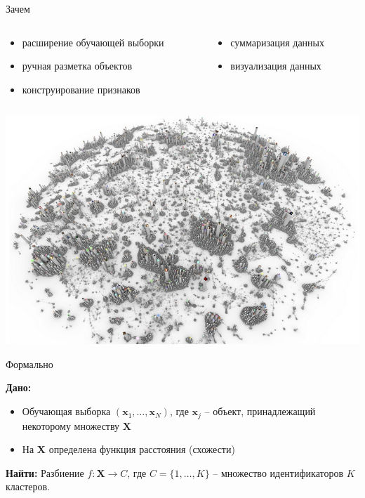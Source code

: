 \documentclass[10pt,a4paper]{beamer}
\begin{document}
\begin{frame}{Зачем}

\begin{columns}[T]
    \begin{column}{.55\textwidth}
    \begin{itemize}
	\item расширение обучающей выборки
	\item ручная разметка объектов
	\item конструирование признаков 
	\end{itemize}
    \end{column}
       
    \begin{column}{.45\textwidth}
    \begin{itemize}
	\item суммаризация данных
	\item визуализация данных
	\end{itemize}
	\end{column}
  \end{columns}

    \begin{center}
    \includegraphics[scale=0.26]{images/sover.png}
    \end{center}

\end{frame}


\begin{frame}{Формально}

{\bf Дано:}
\begin{itemize}
\item Обучающая выборка $(\mathbf x_1, \ldots, \mathbf x_N)$, где $\mathbf{x}_j$ -- объект, принадлежащий некоторому множеству $\mathbf{X}$
\item На $\mathbf{X}$ определена функция расстояния (схожести)
\end{itemize}

\vspace{1em}
{\bf Найти:}
Разбиение $f: \mathbf{X} \rightarrow C$, где $C = \{1, \ldots, K\}$ -- множество идентификаторов  $K$ кластеров.

\end{frame}
\end{document}
